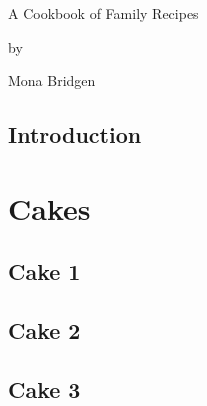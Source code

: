 \documentclass[twoside]{book}
\begin{document}
\begin{titlepage}

	\begin{center}
		\vspace*{14em}
		{\Huge A Cookbook of Family Recipes }

		\vspace{3em}
		by

		\vspace{3em}
		{\Large Mona Bridgen}
	\end{center}

\end{titlepage}

\setcounter{page}{1}
\cleardoublepage

\section*{Introduction}
\blindtext

\tableofcontents{}

\chapter{Cakes}
\blindtext
\newpage

	\section{Cake 1}
	\blindtext
	\newpage

	\section{Cake 2}
	\blindtext
	\newpage

	\section{Cake 3}
	\blindtext
	\newpage
\end{document}
